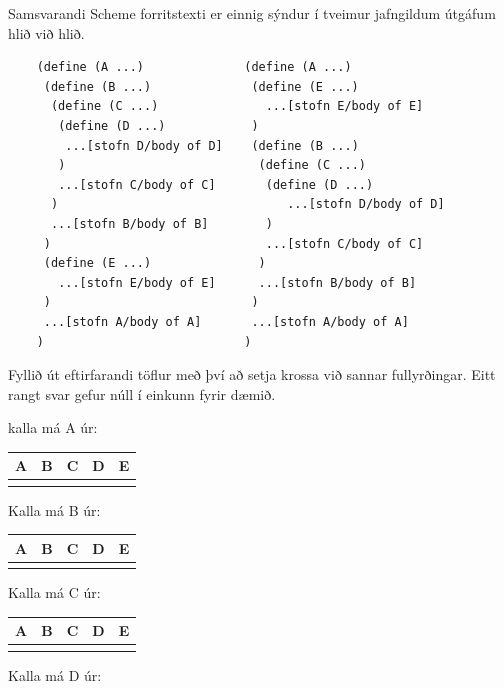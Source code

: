 \documentclass{article}
\newcommand{\bo}[1]{\textbf{#1}}
\begin{document}
Samsvarandi Scheme forritstexti er einnig sýndur í tveimur
jafngildum útgáfum hlið við hlið.

\begin{verbatim}
    (define (A ...)              (define (A ...)
     (define (B ...)              (define (E ...)
      (define (C ...)               ...[stofn E/body of E]
       (define (D ...)            )
        ...[stofn D/body of D]    (define (B ...)
       )                           (define (C ...)
       ...[stofn C/body of C]       (define (D ...)
      )                                ...[stofn D/body of D]
      ...[stofn B/body of B]        )
     )                              ...[stofn C/body of C]
     (define (E ...)               ) 
       ...[stofn E/body of E]      ...[stofn B/body of B]
     )                            )
     ...[stofn A/body of A]       ...[stofn A/body of A]
    )                            )
\end{verbatim}

Fyllið út eftirfarandi töflur með því að setja krossa við sannar fullyrðingar.
Eitt rangt svar gefur núll í einkunn fyrir dæmið.

kalla má A úr:


\begin{tabularx}{\textwidth}{|X|X|X|X|X|}
    \hline
    \bo{A} & \bo{B} & \bo{C} & \bo{D} & \bo{E}\\ \hline
    & & & & \\ \hline
\end{tabularx}

\newpage
Kalla má B úr:


\begin{tabularx}{\textwidth}{|X|X|X|X|X|}
    \hline
    \bo{A} & \bo{B} & \bo{C} & \bo{D} & \bo{E}\\ \hline
    & & & & \\ \hline
\end{tabularx}


\vspace{1cm}

Kalla má C úr:


\begin{tabularx}{\textwidth}{|X|X|X|X|X|}
    \hline
    \bo{A} & \bo{B} & \bo{C} & \bo{D} & \bo{E}\\ \hline
    & & & & \\ \hline
\end{tabularx}

\vspace{1cm}

Kalla má D úr: 
\end{document}
